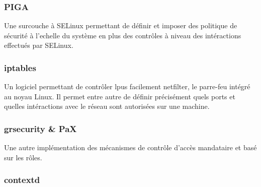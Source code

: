 \subsubsection{PIGA}

Une surcouche à SELinux permettant de définir et imposer des politique de sécurité à l'echelle du système en plus des contrôles à niveau des intéractions effectués par SELinux.

\subsubsection{iptables}

Un logiciel permettant de contrôler lpus facilement netfilter, le parre-feu intégré au noyau Linux. Il permet entre autre de définir précisément quels ports et quelles intéractions avec le réseau sont autorisées sur une machine.

\subsubsection{grsecurity \& PaX}

Une autre implémentation des mécanismes de contrôle d'accès mandataire et basé sur les rôles.

\subsubsection{contextd}